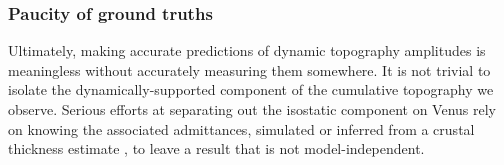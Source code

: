 \documentclass[trackchanges]{aastex63}
\newcommand{\todo}[1]{\textit{\textcolor{violet}{{#1}}}}
\begin{document}



\subsubsection{Paucity of ground truths}\label{sec:benchmarks}

Ultimately, making accurate predictions of dynamic topography amplitudes is meaningless without accurately measuring them somewhere. It is not trivial to isolate the dynamically-supported component of the cumulative topography we observe. Serious efforts at separating out the isostatic component on Venus rely on knowing the associated admittances, simulated or inferred from a crustal thickness estimate \citep{mckenzie_relationship_1994, pauer_modeling_2006, wei_gravity_2014, yang_separation_2016}, to leave a result that is not model-independent. 
\end{document}
